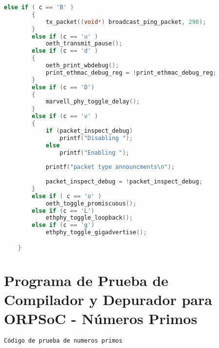 \begin{lstlisting}[language=C,frame=single]
		else if ( c == 'B' )
		{
			tx_packet((void*) broadcast_ping_packet, 298);
		}
		else if (c == 'u' )
			oeth_transmit_pause();
		else if (c == 'd' )
		{
			oeth_print_wbdebug();
			print_ethmac_debug_reg = !print_ethmac_debug_reg;
		}
		else if (c == 'D')
		{
			marvell_phy_toggle_delay();
		}
		else if (c == 'v' )
		{
			if (packet_inspect_debug)
				printf("Disabling ");
			else 
				printf("Enabling ");
			
			printf("packet type announcments\n");
			
			packet_inspect_debug = !packet_inspect_debug;
		}
		else if ( c == 'o' )
			oeth_toggle_promiscuous();
		else if (c == 'L')
			ethphy_toggle_loopback();
		else if (c == 'g')
			ethphy_toggle_gigadvertise();

	}
	 \end{lstlisting}
	 
	  \section{Programa de Prueba de Compilador y Depurador para ORPSoC - Números Primos}
 \begin{lstlisting}[language=C,frame=single]
Código de prueba de numeros primos 
	 \end{lstlisting}
	